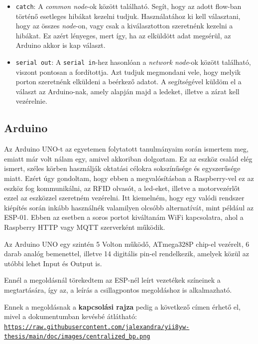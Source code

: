 \documentclass[
]{thesis-ekf}
\theoremstyle{definition}
\theoremstyle{remark}
\begin{document}
\begin{itemize}
    \item \verb|catch|: A \emph{common node}-ok között található. Segít, hogy az adott flow-ban történő esetleges hibákat kezelni tudjuk. Használatához ki kell választani, hogy az összes \emph{node}-on, vagy csak a kiválasztotton szeretnénk kezelni a hibákat. Ez azért lényeges, mert így, ha az elküldött adat megsérül, az Arduino akkor is kap választ.

    \item \verb|serial out|: A \texttt{serial in}-hez hasonlóan a \emph{network node}-ok között található, viszont pontosan a fordítottja. Azt tudjuk megmondani vele, hogy melyik porton szeretnénk elküldeni a beérkező adatot. A segítségével küldöm el a választ az Arduino-nak, amely alapján majd a ledeket, illetve a zárat kell vezérelnie.
\end{itemize}

\subsection{Arduino} \label{arduino}
Az Arduino UNO-t az egyetemen folytatott tanulmányaim során ismertem meg, emiatt már volt nálam egy, amivel akkoriban dolgoztam. Ez az eszköz család elég ismert, széles körben használják oktatási célokra sokszínűsége és egyszerűsége miatt. Ezért úgy gondoltam, hogy ebben a megvalósításban a Raspberry-vel ez az eszköz fog kommunikálni, az RFID olvasót, a led-eket, illetve a motorvezérlőt ezzel az eszközzel szeretném vezérelni.
Itt kiemelném, hogy egy valódi rendszer kiépítés során inkább használnék valamilyen olcsóbb alternatívát, mint például az ESP-01. Ebben az esetben a soros portot kiváltanám WiFi kapcsolatra, ahol a Raspberry HTTP vagy MQTT szerverként működik.

Az Arduino UNO egy szintén 5 Volton működő, ATmega328P chip-el vezérelt, 6 darab analóg bemenettel, illetve 14 digitális pin-el rendelkezik, amelyek közül az utóbbi lehet Input és Output is. \cite{arduino-uno}

Ennél a megoldásnál törekedtem az ESP-nél leírt vezetékek színeinek a megtartására, így az, a leírás a csillagpontos megoldáshoz is alkalmazható.

Ennek a megoldásnak a \textbf{kapcsolási rajza} pedig a következő címen érhető el, mivel a dokumentumban kevésbé átlátható:
\\\texttt{\url{https://raw.githubusercontent.com/jalexandra/yii8yw-thesis/main/doc/images/centralized_bp.png}}
\end{document}
